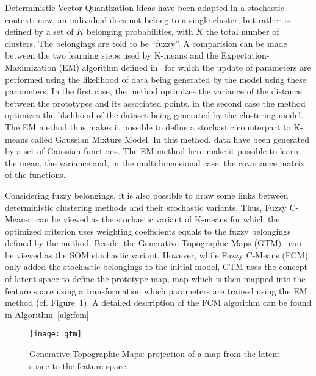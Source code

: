  Deterministic Vector Quantization ideas have been adapted in a stochastic context: now, an individual does not belong to a single cluster, but rather is defined by a set of $K$ belonging probabilities, with $K$ the total number of clusters. The belongings are told to be ``fuzzy''. A comparision can be made between the two learning steps used by K-means and the Expectation-Maximization (EM) algorithm defined in~\cite{dempster1977maximum} for which the update of parameters are performed using the likelihood of data being generated by the model using these parameters. In the first case, the method optimizes the variance of the distance between the prototypes and its associated points, in the second case the method optimizes the likelihood of the dataset being generated by the clustering model. The EM method thus makes it possible to define a stochastic counterpart to K-means called Gaussian Mixture Model. In this method, data have been generated by a set of Gaussian functions. The EM method here make it possible to learn the mean, the variance and, in the multidimensional case, the covariance matrix of the functions.
    
 Considering fuzzy belongings, it is also possible to draw some links between deterministic clustering methods and their stochastic variants. Thus, Fuzzy C-Means~\cite{bezdek1984fcm} can be viewed as the stochastic variant of K-means for which the optimized criterion uses weighting coefficients equals to the fuzzy belongings defined by the method. Beside, the Generative Topographic Maps (GTM)~\cite{bishop1998gtm} can be viewed as the SOM stochastic variant. However, while Fuzzy C-Means (FCM) only added the stochastic belongings to the initial model, GTM uses the concept of latent space to define the prototype map, map which is then mapped into the feature space using a transformation which parameters are trained using the EM method (cf. Figure~\ref{fig:gtm}). A detailed description of the FCM algorithm can be found in Algorithm~\ref{alg:fcm}

        \vspace{0.8cm}
   
        \begin{figure}[h]
            \centering
            \texttt{[image: gtm]}
            \caption{Generative Topographic Maps: projection of a map from the latent space to the feature space}
\label{fig:gtm}
        \end{figure}

